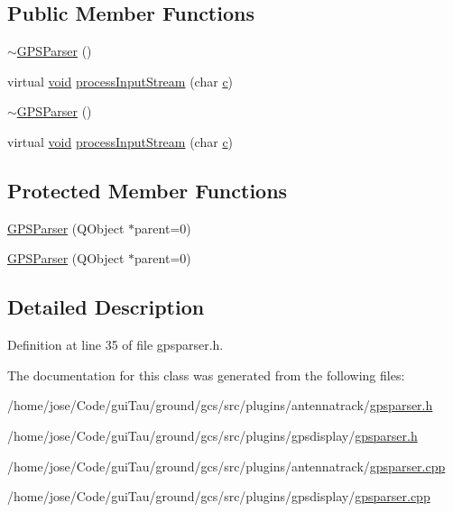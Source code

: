 \subsection*{Public Member Functions}
\begin{DoxyCompactItemize}
\item 
\hyperlink{group___antenna_track_gadget_plugin_ga6773ae49e6fecc274191f0d0e29294d8}{$\sim$\-G\-P\-S\-Parser} ()
\item 
virtual \hyperlink{group___u_a_v_objects_plugin_ga444cf2ff3f0ecbe028adce838d373f5c}{void} \hyperlink{group___antenna_track_gadget_plugin_ga0d2ef23accd7d2cd3e098012f2f8e948}{process\-Input\-Stream} (char \hyperlink{glext_8h_a1f2d7f8147412c43ba2303a56f97ee73}{c})
\item 
\hyperlink{group___g_p_s_gadget_plugin_ga6773ae49e6fecc274191f0d0e29294d8}{$\sim$\-G\-P\-S\-Parser} ()
\item 
virtual \hyperlink{group___u_a_v_objects_plugin_ga444cf2ff3f0ecbe028adce838d373f5c}{void} \hyperlink{group___g_p_s_gadget_plugin_gaeffbbe785fb02705aba8d3e2b0aee5e5}{process\-Input\-Stream} (char \hyperlink{glext_8h_a1f2d7f8147412c43ba2303a56f97ee73}{c})
\end{DoxyCompactItemize}
\subsection*{Protected Member Functions}
\begin{DoxyCompactItemize}
\item 
\hyperlink{group___antenna_track_gadget_plugin_ga15bb435154bfad7f732bc090c496915e}{G\-P\-S\-Parser} (Q\-Object $\ast$parent=0)
\item 
\hyperlink{group___g_p_s_gadget_plugin_ga15bb435154bfad7f732bc090c496915e}{G\-P\-S\-Parser} (Q\-Object $\ast$parent=0)
\end{DoxyCompactItemize}


\subsection{Detailed Description}


Definition at line 35 of file gpsparser.\-h.



The documentation for this class was generated from the following files\-:\begin{DoxyCompactItemize}
\item 
/home/jose/\-Code/gui\-Tau/ground/gcs/src/plugins/antennatrack/\hyperlink{antennatrack_2gpsparser_8h}{gpsparser.\-h}\item 
/home/jose/\-Code/gui\-Tau/ground/gcs/src/plugins/gpsdisplay/\hyperlink{gpsdisplay_2gpsparser_8h}{gpsparser.\-h}\item 
/home/jose/\-Code/gui\-Tau/ground/gcs/src/plugins/antennatrack/\hyperlink{antennatrack_2gpsparser_8cpp}{gpsparser.\-cpp}\item 
/home/jose/\-Code/gui\-Tau/ground/gcs/src/plugins/gpsdisplay/\hyperlink{gpsdisplay_2gpsparser_8cpp}{gpsparser.\-cpp}\end{DoxyCompactItemize}
